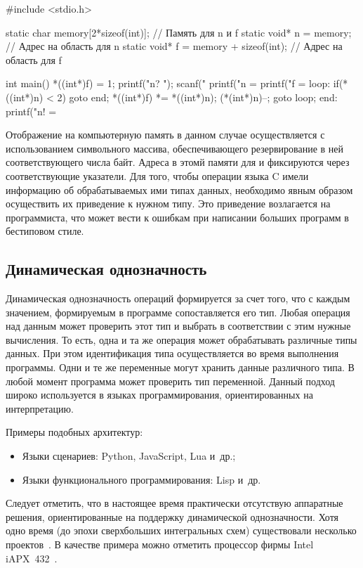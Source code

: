 \begin{ffcode}
#include <stdio.h>

static char memory[2*sizeof(int)];     // Память для n и f
static void* n = memory;               // Адрес на область для n
static void* f = memory + sizeof(int); // Адрес на область для f

int main() {
    *((int*)f) = 1;
    printf("n? ");
    scanf("%
    printf("n = %
    printf("f = %
loop:
    if(*((int*)n) < 2) goto end;
    *((int*)f) *= *((int*)n);
    (*(int*)n)--;
    goto loop;
end:
    printf("n! = %
}
\end{ffcode}
Отображение на компьютерную память в данном случае осуществляется с использованием символьного массива, обеспечивающего резервирование в ней соответствующего числа байт. Адреса в этомй памяти для  и  фиксируются через соответствующие указатели. Для того, чтобы операции языка C имели информацию об обрабатываемых ими типах данных, необходимо явным образом осуществить их приведение к нужном типу. Это приведение возлагается на программиста, что может вести к ошибкам при написании больших программ в бестиповом стиле.

\subsection{Динамическая однозначность}

Динамическая однозначность операций формируется за счет того, что с каждым значением, формируемым в программе сопоставляется его тип. Любая операция над данным может проверить этот тип и выбрать в соответствии с этим нужные вычисления. То есть, одна и та же операция может обрабатывать различные типы данных. При этом идентификация типа осуществляется во время выполнения программы. Одни и те же переменные могут хранить данные различного типа. В любой момент программа может проверить тип переменной. Данный подход широко используется в языках программирования, ориентированных на интерпретацию.

Примеры подобных архитектур:
\begin{itemize}
    \item Языки сценариев: Python, JavaScript, Lua и~др.;
    \item Языки функционального программирования: Lisp и~др.
\end{itemize}
Следует отметить, что в настоящее время практически отсутствую аппаратные решения, ориентированные на поддержку динамической однозначности. Хотя одно время (до эпохи сверхбольших интегральных схем) существовали несколько проектов~\cite{modern-arch}. В качестве примера можно отметить процессор фирмы Intel iAPX~432~\cite{i432-1,i432-2}.


